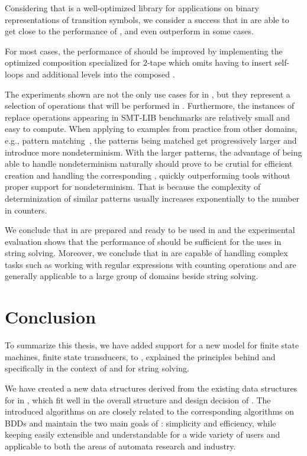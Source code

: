 Considering that \mona is a well-optimized library for applications on binary representations of transition symbols, we consider a success that \nfts in \mata are able to get close to the performance of \mona, and even outperform \mona in some cases.

For most cases, the performance of \mata should be improved by implementing the optimized composition specialized for $2$-tape \nfts which omits having to insert self-loops and additional levels into the composed \nfts.

The experiments shown are not the only use cases for \nfts in \mata, but they represent a selection of operations that will be performed in \noodler.
Furthermore, the instances of replace operations appearing in SMT-LIB benchmarks are relatively small and easy to compute.
When applying \nfts to examples from practice from other domains, e.g., pattern matching~\cite{10.1007/978-3-031-30829-1_19}, the patterns being matched get progressively larger and introduce more nondeterminism.
With the larger patterns, the advantage of \mata being able to handle nondeterminism naturally should prove to be crutial for efficient creation and handling the corresponding \nfts, quickly outperforming tools without proper support for nondeterminism.
That is because the complexity of determinization of similar patterns usually increases exponentially to the number in counters.

We conclude that \nfts in \mata are prepared and ready to be used in \noodler and the experimental evaluation shows that the performance of \mata should be sufficient for the uses in string solving.
Moreover, we conclude that \nfts in \mata are capable of handling complex tasks such as working with regular expressions with counting operations and are generally applicable to a large group of domains beside string solving.

\chapter{Conclusion}

To summarize this thesis, we have added support for a new model for finite state machines, finite state transducers, to \mata, explained the principles behind \nfts and specifically \nfts in the context of \mata and \noodler for string solving.

We have created a new data structures derived from the existing data structures for \nfas in \mata, which fit well in the overall structure and design decision of \mata.
The introduced algorithms on \nfts are closely related to the corresponding algorithms on BDDs and maintain the two main goals of \mata: simplicity and efficiency, while keeping \mata easily extensible and understandable for a wide variety of users and applicable to both the areas of automata research and industry.

